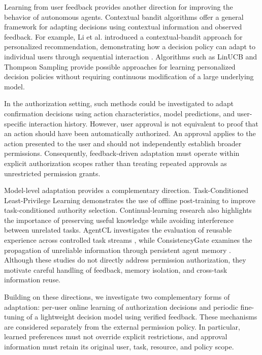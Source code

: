 \documentclass[10pt,conference]{IEEEtran}
\begin{document}
Learning from user feedback provides another direction for improving the behavior of autonomous agents. Contextual bandit algorithms offer a general framework for adapting decisions using contextual information and observed feedback. For example, Li et al. introduced a contextual-bandit approach for personalized recommendation, demonstrating how a decision policy can adapt to individual users through sequential interaction \cite{li2010contextualbandit}. Algorithms such as LinUCB and Thompson Sampling provide possible approaches for learning personalized decision policies without requiring continuous modification of a large underlying model.

In the authorization setting, such methods could be investigated to adapt confirmation decisions using action characteristics, model predictions, and user-specific interaction history. However, user approval is not equivalent to proof that an action should have been automatically authorized. An approval applies to the action presented to the user and should not independently establish broader permissions. Consequently, feedback-driven adaptation must operate within explicit authorization scopes rather than treating repeated approvals as unrestricted permission grants.

Model-level adaptation provides a complementary direction. Task-Conditioned Least-Privilege Learning \cite{tu2026tasklp} demonstrates the use of offline post-training to improve task-conditioned authority selection. Continual-learning research also highlights the importance of preserving useful knowledge while avoiding interference between unrelated tasks. AgentCL investigates the evaluation of reusable experience across controlled task streams \cite{shu2026agentcl}, while ConsistencyGate examines the propagation of unreliable information through persistent agent memory \cite{zhang2026consistencygate}. Although these studies do not directly address permission authorization, they motivate careful handling of feedback, memory isolation, and cross-task information reuse.

Building on these directions, we investigate two complementary forms of adaptation: per-user online learning of authorization decisions and periodic fine-tuning of a lightweight decision model using verified feedback. These mechanisms are considered separately from the external permission policy. In particular, learned preferences must not override explicit restrictions, and approval information must retain its original user, task, resource, and policy scope.
\end{document}
